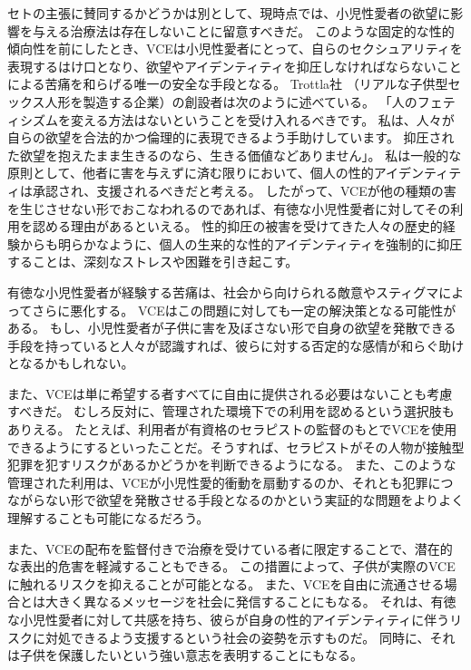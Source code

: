 \documentclass[paper=a4,book,openany]{jlreq}
\begin{document}
セトの主張に賛同するかどうかは別として、現時点では、小児性愛者の欲望に影響を与える治療法は存在しないことに留意すべきだ\citep[p.1155]{tiehen18:_virtual_ethic_creep_act}。
このような固定的な性的傾向性を前にしたとき、VCEは小児性愛者にとって、自らのセクシュアリティを表現するはけ口となり、欲望やアイデンティティを抑圧しなければならないことによる苦痛を和らげる唯一の安全な手段となる。
Trottla社 （リアルな子供型セックス人形を製造する企業）の創設者は次のように述べている。
「人のフェティシズムを変える方法はないということを受け入れるべきです。
私は、人々が自らの欲望を合法的かつ倫理的に表現できるよう手助けしています。
抑圧された欲望を抱えたまま生きるのなら、生きる価値などありません」\citep{morin16:_can_child_dolls_keep_pedop_offen}。
私は一般的な原則として、他者に害を与えずに済む限りにおいて、個人の性的アイデンティティは承認され、支援されるべきだと考える。
したがって、VCEが他の種類の害を生じさせない形でおこなわれるのであれば、有徳な小児性愛者に対してその利用を認める理由があるといえる。
性的抑圧の被害を受けてきた人々の歴史的経験からも明らかなように、個人の生来的な性的アイデンティティを強制的に抑圧することは、深刻なストレスや困難を引き起こす。

有徳な小児性愛者が経験する苦痛は、社会から向けられる敵意やスティグマによってさらに悪化する。
VCEはこの問題に対しても一定の解決策となる可能性がある。
もし、小児性愛者が子供に害を及ぼさない形で自身の欲望を発散できる手段を持っていると人々が認識すれば、彼らに対する否定的な感情が和らぐ助けとなるかもしれない。

また、VCEは単に希望する者すべてに自由に提供される必要はないことも考慮すべきだ。
むしろ反対に、管理された環境下での利用を認めるという選択肢もありえる。
たとえば、利用者が有資格のセラピストの監督のもとでVCEを使用できるようにするといったことだ。そうすれば、セラピストがその人物が接触型犯罪を犯すリスクがあるかどうかを判断できるようになる。
また、このような管理された利用は、VCEが小児性愛的衝動を扇動するのか、それとも犯罪につながらない形で欲望を発散させる手段となるのかという実証的な問題をよりよく理解することも可能になるだろう。

また、VCEの配布を監督付きで治療を受けている者に限定することで、潜在的な表出的危害を軽減することもできる。
この措置によって、子供が実際のVCEに触れるリスクを抑えることが可能となる。
また、VCEを自由に流通させる場合とは大きく異なるメッセージを社会に発信することにもなる。
それは、有徳な小児性愛者に対して共感を持ち、彼らが自身の性的アイデンティティに伴うリスクに対処できるよう支援するという社会の姿勢を示すものだ。
同時に、それは子供を保護したいという強い意志を表明することにもなる。
\end{document}
